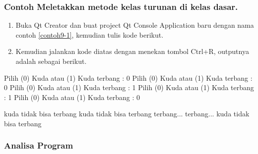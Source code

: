 \subsubsection*{Contoh  Meletakkan metode kelas turunan di kelas dasar.}

\begin{enumerate}

\item
  Buka Qt Creator dan buat project Qt Console Application baru dengan
  nama contoh \ref{contoh9-1}, kemudian tulis kode berikut.




\item
  Kemudian jalankan kode diatas dengan menekan tombol Ctrl+R, outputnya
  adalah sebagai berikut.
\end{enumerate}

\begin{lcverbatim}
Pilih (0) Kuda atau (1) Kuda terbang : 0
Pilih (0) Kuda atau (1) Kuda terbang : 0
Pilih (0) Kuda atau (1) Kuda terbang : 1
Pilih (0) Kuda atau (1) Kuda terbang : 1
Pilih (0) Kuda atau (1) Kuda terbang : 0

kuda tidak bisa terbang
kuda tidak bisa terbang
terbang...
terbang...
kuda tidak bisa terbang
\end{lcverbatim}

\subsubsection*{Analisa Program}

